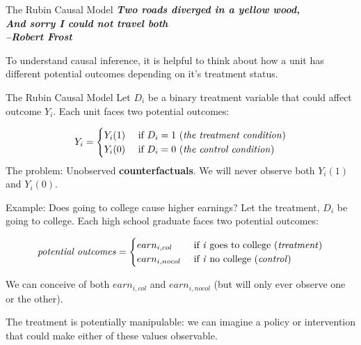 \documentclass[
  ignorenonframetext,
]{beamer}
\begin{document}
\begin{frame}{The Rubin Causal Model}
\protect\hypertarget{the-rubin-causal-model}{}
\textbf{\emph{Two roads diverged in a yellow wood,}}\\
\textbf{\emph{And sorry I could not travel both}}\\
\textbf{\emph{--Robert Frost}}

To understand causal inference, it is helpful to think about how a unit
has different potential outcomes depending on it's treatment status.
\end{frame}

\begin{frame}{The Rubin Causal Model}
\protect\hypertarget{the-rubin-causal-model-1}{}
Let \(D_i\) be a binary treatment variable that could affect outcome
\(Y_i\). Each unit faces two potential outcomes:

\[
\begin{split}
Y_i& = \begin{cases}
      Y_i(1) & \text{ if } D_i=1 \text{ (\textit{the treatment condition})}\\
      Y_i(0) & \text{ if } D_i=0 \text{ (\textit{the control condition})}
    \end{cases}  \\
\end{split}
\] The problem: Unobserved \textbf{counterfactuals}. We will never
observe both \(Y_i(1)\) and \(Y_i(0)\).
\end{frame}

\begin{frame}{Example: Does going to college cause higher earnings?}
\protect\hypertarget{example-does-going-to-college-cause-higher-earnings}{}
Let the treatment, \(D_i\) be going to college. Each high school
graduate faces two potential outcomes:

\[
\begin{split}
\text{\textit{potential outcomes}}= \begin{cases}
      earn_{i,col} & \text{ if \textit{i} goes to college} \text{ (\textit{treatment})}\\
      earn_{i,no col} & \text{ if \textit{i} no college} \text{ (\textit{control})}
    \end{cases}  
\end{split}
\]

We can conceive of both \(earn_{i,col}\) and \(earn_{i,no col}\) (but
will only ever observe one or the other).

The treatment is potentially manipulable: we can imagine a policy or
intervention that could make either of these values observable.
\end{frame}
\end{document}
